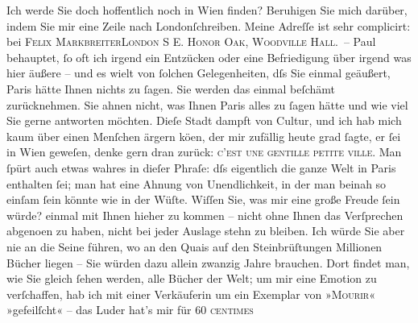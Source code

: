 \begin{ledgroupsized}[t]{13cm}
           \pstart
           Ich werde Sie doch hoffentlich noch in Wien
               finden? Beruhigen {\pb}Sie mich darüber, indem Sie mir
               eine Zeile nach Londonſchreiben. Meine Adreſſe ist sehr complicirt: bei
                  \textsc{Felix MarkbreiterLondon S E. Honor Oak, Woodville Hall}. –\pend
           \pstart
           Paul behauptet, ſo oft ich irgend ein
               Entzücken oder eine Befriedigung über irgend was hier äußere – und es wi{\geminationm}elt von ſolchen Gelegenheiten, dſs Sie einmal ge{\pb}äußert, Paris
               hätte Ihnen nichts zu ſagen. Sie werden das einmal beſchämt zurücknehmen. Sie ahnen
               nicht, was Ihnen Paris alles zu ſagen hätte und
               wie viel Sie gerne antworten möchten. Dieſe Stadt dampft von Cultur, und ich hab mich
               kaum über einen Menſchen ärgern kö{\geminationn}en, der mir zufällig
               heute grad ſagte, er ſei in Wien geweſen, {\pb}denke gern dran zurück: \textsc{c’est une
                  gentille petite ville}. Man ſpürt auch etwas wahres in dieſer Phraſe: dſs
               eigentlich die ganze Welt in Paris enthalten ſei;
               man hat eine Ahnung von Unendlichkeit, in der man beinah so einſam ſein könnte wie in
               der Wüſte. Wiſſen Sie, was mir eine große Freude ſein würde? einmal mit Ihnen hieher
               zu kommen – nicht {\pb}ohne Ihnen das Verſprechen abgeno{\geminationm}en zu haben, nicht bei jeder Auslage stehn zu bleiben.
               Ich würde Sie aber nie an die Seine führen, wo an den Quais auf den Steinbrüſtungen
               Millionen Bücher liegen – Sie würden dazu allein zwanzig Jahre brauchen. Dort findet
               man, wie Sie gleich ſehen werden, alle Bücher der Welt; {\pb}um mir eine Emotion zu verſchaffen, hab ich mit einer
               Verkäuferin um ein Exemplar von »\textsc{Mourir}« »gefeilſcht« – das Luder hat’s mir für 60 \textsc{centimes}

\end{ledgroupsized}
